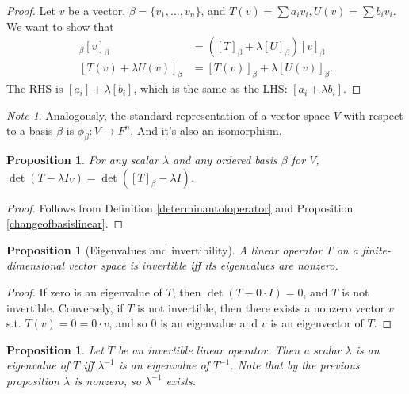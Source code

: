 \documentclass[12pt]{article}
\theoremstyle{plain}
\newtheorem{proposition}[theorem]{Proposition}
\theoremstyle{definition}
\theoremstyle{remark}
\newtheorem{note}[theorem]{Note}
\begin{document}
\begin{proof}
Let $v$ be a vector, $\beta = \{v_1,\ldots, v_n\}$, and $T(v) = \sum a_i v_i, U(v) = \sum b_i v_i$. We want to show that
\begin{align*}
[T + \lambda U]_\beta [v]_\beta &= ([T]_\beta + \lambda[U]_\beta)[v]_\beta \\
[T(v) + \lambda U(v)]_\beta &= [T(v)]_\beta + \lambda[U(v)]_\beta.
\end{align*}
The RHS is $[a_i] + \lambda [b_i]$, which is the same as the LHS: $[a_i + \lambda b_i]$.
\end{proof}

\begin{note}
Analogously, the standard representation of a vector space $V$ with respect to a basis $\beta$ is $\phi_\beta: V \longrightarrow F^n.$ And it's also an isomorphism.
\end{note}

\begin{proposition}
For any scalar $\lambda$ and any ordered basis $\beta$ for $V$, $\det(T - \lambda I_V) = \det([T]_\beta - \lambda I)$.
\end{proposition}

\begin{proof}
Follows from Definition \ref{determinantofoperator} and Proposition \ref{changeofbasislinear}.
\end{proof}

\begin{mdframed}
\begin{proposition}[Eigenvalues and invertibility]
A linear operator $T$ on a finite-dimensional vector space is invertible iff its eigenvalues are nonzero.
\end{proposition}
\end{mdframed}

\begin{proof}
If zero is an eigenvalue of $T$, then $\det(T - 0 \cdot I) = 0$, and $T$ is not invertible. Conversely, if $T$ is not invertible, then there exists a nonzero vector $v$ s.t. $T(v) = 0 = 0 \cdot v$, and so 0 is an eigenvalue and $v$ is an eigenvector of $T$.
\end{proof}

\begin{proposition}
Let $T$ be an invertible linear operator. Then a scalar $\lambda$ is an eigenvalue of $T$ iff $\lambda^{-1}$ is an eigenvalue of $T^{-1}$. Note that by the previous proposition $\lambda$ is nonzero, so $\lambda^{-1}$ exists.
\end{proposition}
\end{document}
